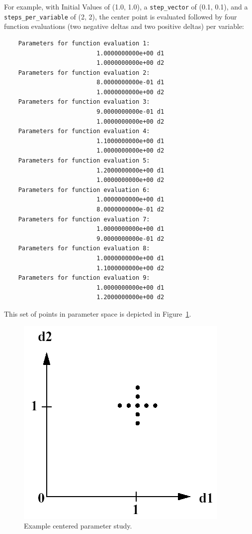 For example, with Initial Values of (1.0, 1.0), a \texttt{step\_vector} 
of (0.1, 0.1), and a \texttt{steps\_per\_variable} of (2, 2), the 
center point is evaluated followed by four function evaluations (two 
negative deltas and two positive deltas) per variable:
\begin{small}
\begin{verbatim}
    Parameters for function evaluation 1:
                          1.0000000000e+00 d1
                          1.0000000000e+00 d2
    Parameters for function evaluation 2:
                          8.0000000000e-01 d1
                          1.0000000000e+00 d2
    Parameters for function evaluation 3:
                          9.0000000000e-01 d1
                          1.0000000000e+00 d2
    Parameters for function evaluation 4:
                          1.1000000000e+00 d1
                          1.0000000000e+00 d2
    Parameters for function evaluation 5:
                          1.2000000000e+00 d1
                          1.0000000000e+00 d2
    Parameters for function evaluation 6:
                          1.0000000000e+00 d1
                          8.0000000000e-01 d2
    Parameters for function evaluation 7:
                          1.0000000000e+00 d1
                          9.0000000000e-01 d2
    Parameters for function evaluation 8:
                          1.0000000000e+00 d1
                          1.1000000000e+00 d2
    Parameters for function evaluation 9:
                          1.0000000000e+00 d1
                          1.2000000000e+00 d2
\end{verbatim}
\end{small}

This set of points in parameter space is depicted in Figure~\ref{ps:figure01}.
\begin{figure}
  \centering
  \includegraphics[scale=0.5]{images/centered_pstudy}
  \caption{Example centered parameter study.}
  \label{ps:figure01}
\end{figure}


